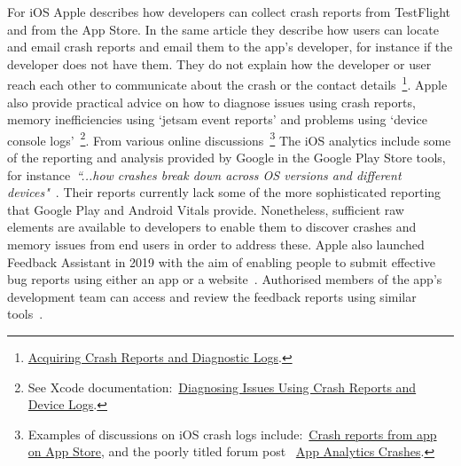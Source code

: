 For iOS Apple describes how developers can collect crash reports from TestFlight and from the App Store. In the same article they describe how users can locate and email crash reports and email them to the app's developer, for instance if the developer does not have them. They do not explain how the developer or user reach each other to communicate about the crash or the contact details~\footnote{\href{https://developer.apple.com/documentation/xcode/diagnosing_issues_using_crash_reports_and_device_logs/acquiring_crash_reports_and_diagnostic_logs}{Acquiring Crash Reports and Diagnostic Logs}.}. 
%
Apple also provide practical advice on how to diagnose issues using crash reports, memory inefficiencies using `jetsam event reports' and problems using `device console logs'~\footnote{See Xcode documentation:~\href{https://developer.apple.com/documentation/xcode/diagnosing_issues_using_crash_reports_and_device_logs}{Diagnosing Issues Using Crash Reports and Device Logs}.}. 
% 
From various online discussions~\footnote{Examples of discussions on iOS crash logs include:~\href{https://stackoverflow.com/questions/10145665/crash-reports-from-app-on-app-store}{Crash reports from app on App Store}, and the poorly titled forum post ~\href{https://developer.apple.com/forums/thread/30934}{App Analytics Crashes}.} 
The iOS analytics include some of the reporting and analysis provided by Google in the Google Play Store tools, for instance~\emph{``...how crashes break down across OS versions and different devices"}~\cite{apple2020_how_to_review_your_apps_crash_logs}. Their reports currently lack some of the more sophisticated reporting that Google Play and Android Vitals provide. Nonetheless, sufficient raw elements are available to developers to enable them to discover crashes and memory issues from end users in order to address these. Apple also launched Feedback Assistant in 2019 with the aim of enabling people to submit effective bug reports using either an app or a website~\cite{appledeveloper2020_bug_reporting_feedback_assistant_for_developers}. Authorised members of the app's development team can access and review the feedback reports using similar tools~\cite{appledeveloper2020_bug_reporting_feedback_assistant_for_developers}.



